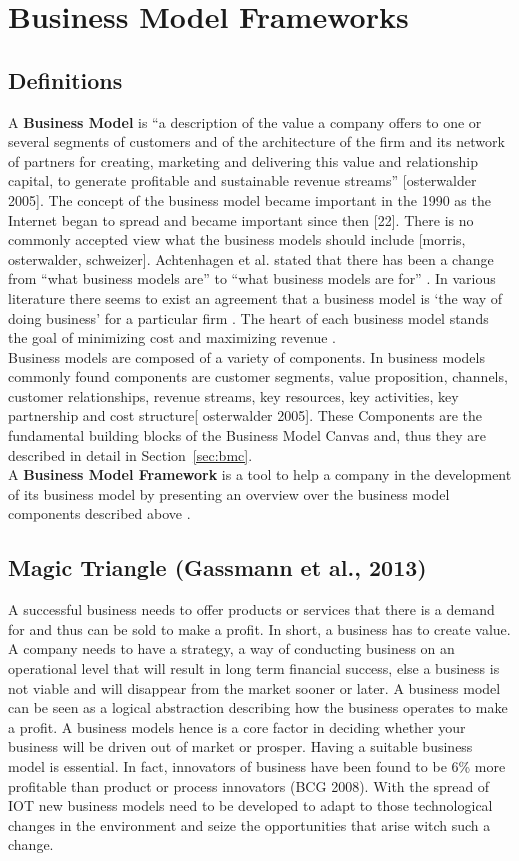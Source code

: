\section{Business Model Frameworks}
\label{sec:bmf}	
	\subsection{Definitions} 
		 A \textbf{Business Model} is ``a description of the value a company offers to one or several segments of customers and of the architecture of the firm and its network of partners for creating, marketing and delivering this value and relationship capital, to generate profitable and sustainable revenue streams'' [osterwalder 2005]. The concept of the business model became important in the 1990 as the Internet began to spread and became important since then [22]. There is no commonly accepted view what the business models should include [morris, osterwalder, schweizer]. Achtenhagen et al. stated that there has been a change from ``what business models are'' to ``what business models are for'' \cite{westerlund}. In various literature there seems to exist an agreement that a business model is `the way of doing business' for a particular firm \cite{westerlund}. The heart of each business model stands the goal of minimizing cost and maximizing revenue \cite{ju}.\\
		 Business models are composed of a variety of components. In business models commonly found components are customer segments, value proposition, channels, customer relationships, revenue streams, key resources, key activities, key partnership and cost structure[ osterwalder 2005]. These Components are the fundamental building blocks of the Business Model Canvas and, thus they are described in detail in Section~\ref{sec:bmc}. \\

		 A \textbf{Business Model Framework} is a tool to help a company in the development of its business model by presenting an overview over the business model components described above \cite{dijkman}.

	\subsection{Magic Triangle (Gassmann et al., 2013)}
		A successful business needs to offer products or services that there is a demand for and thus can be sold to make a profit. In short, a business has to create value. A company needs to have a strategy, a way of conducting business on an operational level that will result in long term financial success, else a business is not viable and will disappear from the market sooner or later.
		A business model can be seen as a logical abstraction describing how the business operates to make a profit. A business models hence is a core factor in deciding whether your business will be driven out of market or prosper. Having a suitable business model is essential. In fact, innovators of business have been found to be 6\% more profitable than product or process innovators (BCG 2008). With the spread of IOT new business models need to be developed to adapt to those technological changes in the environment and seize the opportunities that arise witch such a change. 

